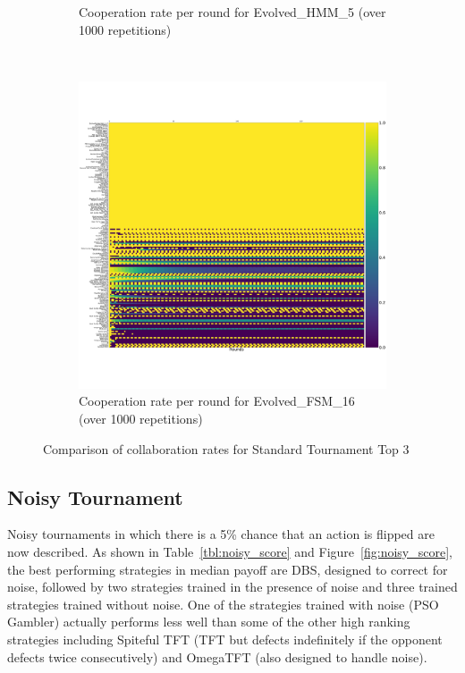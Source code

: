 \documentclass{article}
\begin{document}
\begin{figure}[!hbtp]
\begin{subfigure}[t]{.3\textwidth}
        \caption{Cooperation rate per round for Evolved\_HMM\_5 (over 1000
        repetitions)}
    \end{subfigure}%
    ~
    \begin{subfigure}[t]{.3\textwidth}
        \centering
        \includegraphics[width=\textwidth]{./assets/cooperation_0_0_1000_Evolved_FSM_16_array.pdf}
        \caption{Cooperation rate per round for Evolved\_FSM\_16 (over 1000
        repetitions)}
    \end{subfigure}%

    \caption{Comparison of collaboration rates for Standard Tournament Top 3}
    \label{fig:comparison_cooperation_heatmaps_standard}
\end{figure}


\subsection{Noisy Tournament}\label{sec:noise}

Noisy tournaments in which there is a 5\% chance that an action is
flipped are now described. As shown in Table~\ref{tbl:noisy_score} and
Figure~\ref{fig:noisy_score}, the best performing strategies in median payoff
are DBS, designed to correct for noise, followed by two strategies trained in
the presence of noise and three trained strategies trained without noise. One of
the strategies trained with noise (PSO Gambler) actually performs less well than
some of the other high ranking strategies including
Spiteful TFT (TFT but defects indefinitely if the opponent defects twice
consecutively) and OmegaTFT (also designed to handle noise).
\end{document}

